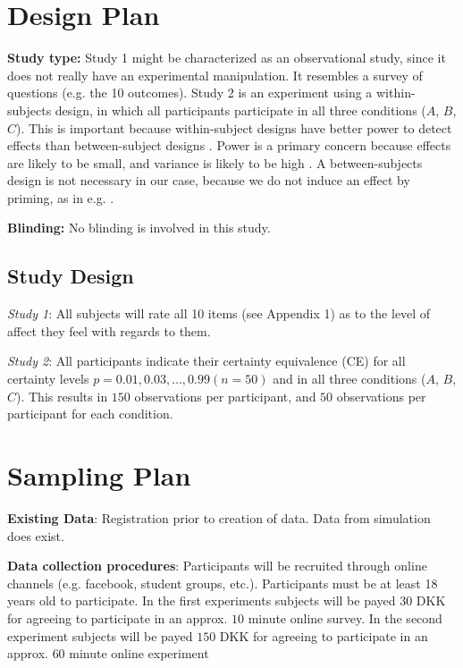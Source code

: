 \documentclass[12pt]{article}
\begin{document}
 \section{Design Plan}

\textbf{Study type:} Study 1 might be characterized
as an observational study, since it does not
really have an experimental manipulation. It
resembles a survey of questions (e.g. the 10
outcomes). Study 2 is an experiment using a
within-subjects design, in which all participants
participate in all three conditions ($A$,  $B$,  $C$).
This is important because within-subject designs
have better power to detect effects than
between-subject designs
\autocite{charness2012experimental}. Power is a
primary concern because effects are likely
to be small, and variance is likely to be high
\autocite{gonzalez1999shape}. A between-subjects
design is not necessary in our case, because we do
not induce an effect by priming, as in e.g.
\textcite{hsee2004music}.

\textbf{Blinding:} No blinding is involved in this study. \\

\subsection{Study Design}

\emph{Study 1}: All subjects will rate all 10 items
(see Appendix 1) as to the level of affect they
feel with regards to them.

\emph{Study 2}: All participants
indicate their certainty equivalence (CE) for all
certainty levels $p = 0.01, 0.03, \ldots, 0.99 (n = 50)$
and in all three conditions ($A$,  $B$,  $C$).
This results in $150$ observations per participant,
and  $50$ observations per participant for each
condition.

\section{Sampling Plan}

\textbf{Existing Data}: Registration prior
to creation of data. Data from simulation
does exist.

\textbf{Data collection procedures}:
Participants will be recruited through online
channels (e.g. facebook, student groups, etc.).
Participants must be at least 18 years old to
participate. In the first experiments subjects
will be payed $30$ DKK for agreeing to participate
in an approx. $10$ minute online survey. In the
second experiment subjects will be payed $150$ DKK
for agreeing to participate in an approx. $60$ minute
online experiment
\end{document}
